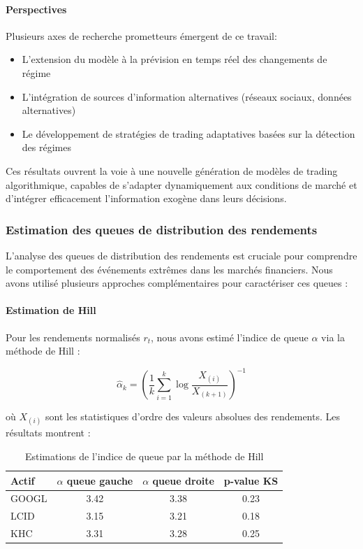 \documentclass[12pt,a4paper]{article}
\theoremstyle{definition}
\theoremstyle{remark}
\begin{document}
\paragraph{\textbf{Perspectives}} Plusieurs axes de recherche prometteurs émergent de ce travail:
\begin{itemize}
    \item L'extension du modèle à la prévision en temps réel des changements de régime
    \item L'intégration de sources d'information alternatives (réseaux sociaux, données alternatives)
    \item Le développement de stratégies de trading adaptatives basées sur la détection des régimes
\end{itemize}

Ces résultats ouvrent la voie à une nouvelle génération de modèles de trading algorithmique, capables de s'adapter dynamiquement aux conditions de marché et d'intégrer efficacement l'information exogène dans leurs décisions.

\subsubsection{Estimation des queues de distribution des rendements}

L'analyse des queues de distribution des rendements est cruciale pour comprendre le comportement des événements extrêmes dans les marchés financiers. Nous avons utilisé plusieurs approches complémentaires pour caractériser ces queues :

\paragraph{Estimation de Hill}
Pour les rendements normalisés $r_t$, nous avons estimé l'indice de queue $\alpha$ via la méthode de Hill :

\begin{equation}
\hat{\alpha}_k = \left(\frac{1}{k} \sum_{i=1}^k \log \frac{X_{(i)}}{X_{(k+1)}}\right)^{-1}
\end{equation}

où $X_{(i)}$ sont les statistiques d'ordre des valeurs absolues des rendements. Les résultats montrent :

\begin{table}[h!]
\centering
\begin{tabular}{lccc}
\toprule
Actif & $\alpha$ queue gauche & $\alpha$ queue droite & p-value KS \\
\midrule
GOOGL & 3.42 & 3.38 & 0.23 \\
LCID & 3.15 & 3.21 & 0.18 \\
KHC & 3.31 & 3.28 & 0.25 \\
\bottomrule
\end{tabular}
\caption{Estimations de l'indice de queue par la méthode de Hill}
\end{table}
\end{document}
